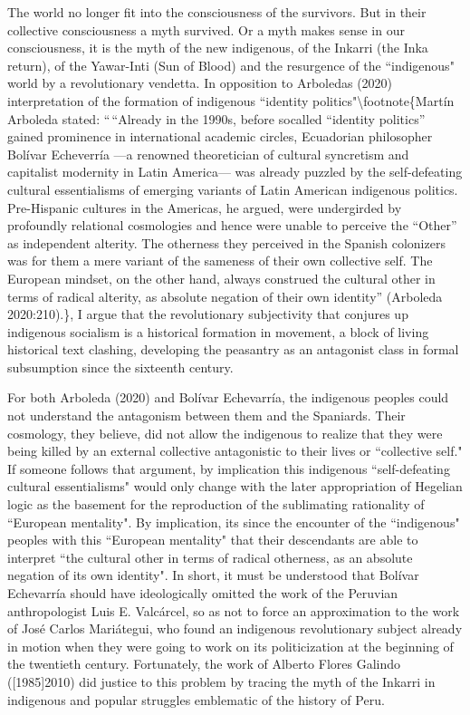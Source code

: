 \documentclass[
]{article}
\begin{document}
The world no longer fit into the consciousness of the survivors. But in
their collective consciousness a myth survived. Or a myth makes sense in
our consciousness, it is the myth of the new indigenous, of the Inkarri
(the Inka return), of the Yawar-Inti (Sun of Blood) and the resurgence
of the ``indigenous" world by a revolutionary vendetta. In opposition to
Arboleda\textquotesingle s (2020) interpretation of the formation of
indigenous ``identity politics"\textbackslash footnote\{Martín Arboleda
stated: ``\,``Already in the 1990s, before socalled ``identity
politics'' gained prominence in international academic circles,
Ecuadorian philosopher Bolívar Echeverría ---a renowned theoretician of
cultural syncretism and capitalist modernity in Latin America--- was
already puzzled by the self-defeating cultural essentialisms of emerging
variants of Latin American indigenous politics. Pre-Hispanic cultures in
the Americas, he argued, were undergirded by profoundly relational
cosmologies and hence were unable to perceive the ``Other'' as
independent alterity. The otherness they perceived in the Spanish
colonizers was for them a mere variant of the sameness of their own
collective self. The European mindset, on the other hand, always
construed the cultural other in terms of radical alterity, as absolute
negation of their own identity'' (Arboleda 2020:210).\}, I argue that
the revolutionary subjectivity that conjures up indigenous socialism is
a historical formation in movement, a block of living historical text
clashing, developing the peasantry as an antagonist class in formal
subsumption since the sixteenth century.

For both Arboleda (2020) and Bolívar Echevarría, the indigenous peoples
could not understand the antagonism between them and the Spaniards.
Their cosmology, they believe, did not allow the indigenous to realize
that they were being killed by an external collective antagonistic to
their lives or ``collective self." If someone follows that argument, by
implication this indigenous ``self-defeating cultural essentialisms"
would only change with the later appropriation of Hegelian logic as the
basement for the reproduction of the sublimating rationality of
``European mentality". By implication, its since the encounter of the
``indigenous" peoples with this ``European mentality" that their
descendants are able to interpret ``the cultural other in terms of
radical otherness, as an absolute negation of its own identity". In
short, it must be understood that Bolívar Echevarría should have
ideologically omitted the work of the Peruvian anthropologist Luis E.
Valcárcel, so as not to force an approximation to the work of José
Carlos Mariátegui, who found an indigenous revolutionary subject already
in motion when they were going to work on its politicization at the
beginning of the twentieth century. Fortunately, the work of Alberto
Flores Galindo ({[}1985{]}2010) did justice to this problem by tracing
the myth of the Inkarri in indigenous and popular struggles emblematic
of the history of Peru.
\end{document}

